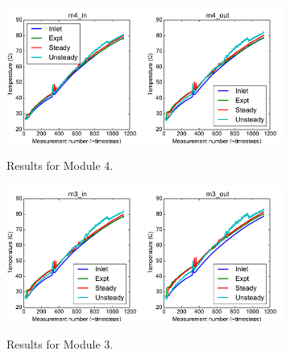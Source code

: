 \documentclass{article}
\begin{document}
\clearpage
\begin{figure}[!ht]
\centering
\includegraphics[width=0.4\textwidth]{../../data/ICSolar/images/Feb27_m4_in_compare.pdf}\hspace{0.05\textwidth}
\includegraphics[width=0.4\textwidth]{../../data/ICSolar/images/Feb27_m4_out_compare.pdf}\hspace{0.05\textwidth}\\
\caption{Results for Module 4.}\end{figure}
\begin{figure}[!ht]
\centering
\includegraphics[width=0.4\textwidth]{../../data/ICSolar/images/Feb27_m3_in_compare.pdf}\hspace{0.05\textwidth}
\includegraphics[width=0.4\textwidth]{../../data/ICSolar/images/Feb27_m3_out_compare.pdf}\hspace{0.05\textwidth}\\
\caption{Results for Module 3.}\end{figure}
\end{document}
